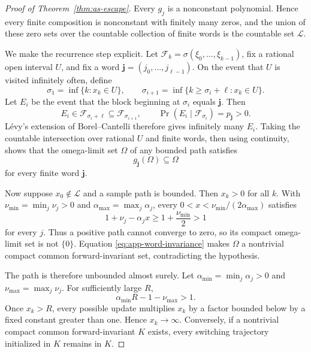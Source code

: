 \documentclass[11pt]{article}
\begin{document}
\begin{proof}[Proof of Theorem~\ref{thm:as-escape}]
Every \(g_j\) is a nonconstant polynomial.  Hence every finite composition
is nonconstant with finitely many zeros, and the union of these zero sets
over the countable collection of finite words is the countable set
\(\mathcal L\).

We make the recurrence step explicit.  Let
\(\mathcal F_k=\sigma(\xi_0,\ldots,\xi_{k-1})\), fix a rational open
interval \(U\), and fix a word
\(\boldsymbol j=(j_0,\ldots,j_{\ell-1})\).  On the event that \(U\) is
visited infinitely often, define
\[
\sigma_1=\inf\{k:x_k\in U\},\qquad
\sigma_{i+1}=\inf\{k\ge\sigma_i+\ell:x_k\in U\}.
\]
Let \(E_i\) be the event that the block beginning at \(\sigma_i\) equals
\(\boldsymbol j\).  Then
\[
E_i\in\mathcal F_{\sigma_i+\ell}
\subseteq\mathcal F_{\sigma_{i+1}},
\qquad
\Pr(E_i\mid\mathcal F_{\sigma_i})
=p_{\boldsymbol j}>0.
\]
L\'evy's extension of Borel--Cantelli therefore gives infinitely many
\(E_i\).  Taking the countable intersection over rational \(U\) and finite
words, then using continuity, shows that the omega-limit set \(\Omega\) of
any bounded path satisfies
\begin{equation}
\label{eq:app-word-invariance}
    g_{\boldsymbol j}(\Omega)\subseteq\Omega
\end{equation}
for every finite word \(\boldsymbol j\).

Now suppose \(x_0\notin\mathcal L\) and a sample path is bounded.  Then
\(x_k>0\) for all \(k\).  With
\(\nu_{\min}=\min_j\nu_j>0\) and
\(\alpha_{\max}=\max_j\alpha_j\), every
\(0<x<\nu_{\min}/(2\alpha_{\max})\) satisfies
\[
    1+\nu_j-\alpha_jx\ge1+\frac{\nu_{\min}}2>1
\]
for every \(j\).  Thus a positive path cannot converge to zero, so its
compact omega-limit set is not \(\{0\}\).  Equation
\eqref{eq:app-word-invariance} makes \(\Omega\) a nontrivial compact common
forward-invariant set, contradicting the hypothesis.

The path is therefore unbounded almost surely.  Let
\(\alpha_{\min}=\min_j\alpha_j>0\) and
\(\nu_{\max}=\max_j\nu_j\).  For sufficiently large \(R\),
\[
    \alpha_{\min}R-1-\nu_{\max}>1.
\]
Once \(x_k>R\), every possible update multiplies \(x_k\) by a factor bounded
below by a fixed constant greater than one.  Hence \(x_k\to\infty\).
Conversely, if a nontrivial compact common forward-invariant \(K\) exists,
every switching trajectory initialized in \(K\) remains in \(K\).
\end{proof}
\end{document}
